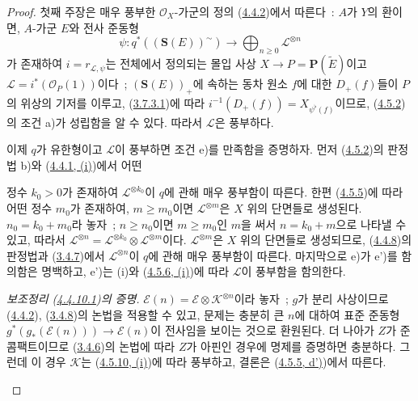 \begin{proof}
첫째 주장은 매우 풍부한 $\mathcal{O}_X$-가군의 정의
(\hyperref[II.4.4.2-ko]{4.4.2})에서 따른다~: $A$가 $Y$의 환이면,
$A$-가군 $E$와 전사 준동형
\[
  \psi:q^*((\mathbf{S}(E))^{\sim})\longrightarrow
  \bigoplus_{n\geq0}\mathcal{L}^{\otimes n}
\]
가 존재하여 $i=r_{\mathcal{L},\psi}$는 전체에서 정의되는 몰입 사상
$X\to P=\mathbf{P}(\widetilde{E})$이고
$\mathcal{L}=i^*(\mathcal{O}_P(1))$이다~; $(\mathbf{S}(E))_+$에 속하는
동차 원소 $f$에 대한 $D_+(f)$들이 $P$의 위상의 기저를 이루고,
(\hyperref[II.3.7.3.1-ko]{3.7.3.1})에 따라
$i^{-1}(D_+(f))=X_{\psi^\flat(f)}$이므로,
(\hyperref[II.4.5.2-ko]{4.5.2})의 조건 a)가 성립함을 알 수 있다.
따라서 $\mathcal{L}$은 풍부하다.

이제 $q$가 유한형이고 $\mathcal{L}$이 풍부하면 조건 e)를 만족함을
증명하자. 먼저 (\hyperref[II.4.5.2-ko]{4.5.2})의 판정법 b)와
(\hyperref[II.4.4.1-ko]{4.4.1, (i)})에서 어떤


정수 $k_0>0$가
존재하여 $\mathcal{L}^{\otimes k_0}$이 $q$에 관해 매우 풍부함이
따른다. 한편 (\hyperref[II.4.5.5-ko]{4.5.5})에 따라 어떤 정수
$m_0$가 존재하여, $m\geq m_0$이면 $\mathcal{L}^{\otimes m}$은
$X$ 위의 단면들로 생성된다. $n_0=k_0+m_0$라 놓자~; $n\geq n_0$이면
$m\geq m_0$인 $m$을 써서 $n=k_0+m$으로 나타낼 수 있고, 따라서
$\mathcal{L}^{\otimes n}
=\mathcal{L}^{\otimes k_0}\otimes\mathcal{L}^{\otimes m}$이다.
$\mathcal{L}^{\otimes m}$은 $X$ 위의 단면들로 생성되므로,
(\hyperref[II.4.4.8-ko]{4.4.8})의 판정법과
(\hyperref[II.3.4.7-ko]{3.4.7})에서 $\mathcal{L}^{\otimes n}$이
$q$에 관해 매우 풍부함이 따른다. 마지막으로 e)가 e')를 함의함은
명백하고, e')는 (i)와 (\hyperref[II.4.5.6-ko]{4.5.6, (i)})에 따라
$\mathcal{L}$이 풍부함을 함의한다.

\begin{env}[4.5.10.1]
\label{II.4.5.10.1-ko}
\emph{보조정리 (\hyperref[II.4.4.10.1-ko]{4.4.10.1})의 증명.}
$\mathcal{E}(n)=\mathcal{E}\otimes\mathcal{K}^{\otimes n}$이라 놓자~;
$g$가 분리 사상이므로 (\hyperref[II.4.4.2-ko]{4.4.2}),
(\hyperref[II.3.4.8-ko]{3.4.8})의 논법을 적용할 수 있고, 문제는 충분히
큰 $n$에 대하여 표준 준동형
$g^*(g_*(\mathcal{E}(n)))\to\mathcal{E}(n)$이 전사임을 보이는 것으로
환원된다. 더 나아가 $Z$가 준콤팩트이므로
(\hyperref[II.3.4.6-ko]{3.4.6})의 논법에 따라 $Z$가 아핀인 경우에
명제를 증명하면 충분하다. 그런데 이 경우 $\mathcal{K}$는
(\hyperref[II.4.5.10-ko]{4.5.10, (i)})에 따라 풍부하고, 결론은
(\hyperref[II.4.5.5-ko]{4.5.5, d')})에서 따른다.
\end{env}
\end{proof}


